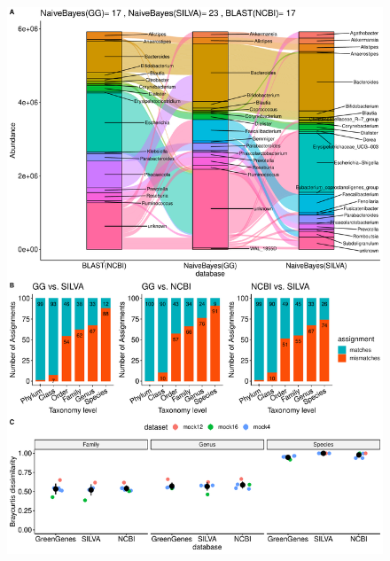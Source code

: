 \documentclass[letterpaper,12pt]{article}
\providecommand{\DIFaddend}{} %
\providecommand{\DIFdelbegin}{} %
\providecommand{\DIFdelend}{} %
\providecommand{\DIFaddbeginFL}{} %
\providecommand{\DIFaddendFL}{} %
\providecommand{\DIFdelbeginFL}{} %
\providecommand{\DIFdelendFL}{} %
\newcommand{\DIFscaledelfig}{0.5}
\newlength{\DIFdelgraphicswidth} %
\newlength{\DIFdelgraphicsheight} %
\newcommand{\DIFaddincludegraphics}[2][]{{\color{blue}\fbox{\DIFOincludegraphics[#1]{#2}}}} %
\newcommand{\DIFdelincludegraphics}[2][]{%
\sbox{\DIFdelgraphicsbox}{\DIFOincludegraphics[#1]{#2}}%
\settoboxwidth{\DIFdelgraphicswidth}{\DIFdelgraphicsbox} %
\settoboxtotalheight{\DIFdelgraphicsheight}{\DIFdelgraphicsbox} %
\scalebox{\DIFscaledelfig}{%
\parbox[b]{\DIFdelgraphicswidth}{\usebox{\DIFdelgraphicsbox}\\[-\baselineskip] \rule{\DIFdelgraphicswidth}{0em}}\llap{\resizebox{\DIFdelgraphicswidth}{\DIFdelgraphicsheight}{%
\setlength{\unitlength}{\DIFdelgraphicswidth}%
\begin{picture}(1,1)%
\thicklines\linethickness{2pt} %
{\color[rgb]{1,0,0}\put(0,0){\framebox(1,1){}}}%
{\color[rgb]{1,0,0}\put(0,0){\line( 1,1){1}}}%
{\color[rgb]{1,0,0}\put(0,1){\line(1,-1){1}}}%
\end{picture}%
}\hspace*{3pt}}} %
} %
\DeclareRobustCommand{\DIFaddend}{\DIFOaddend \let\includegraphics\DIFOincludegraphics} %
\DeclareRobustCommand{\DIFdelbegin}{\DIFOdelbegin \let\includegraphics\DIFdelincludegraphics} %
\DeclareRobustCommand{\DIFdelend}{\DIFOaddend \let\includegraphics\DIFOincludegraphics} %
\DeclareRobustCommand{\DIFaddbeginFL}{\DIFOaddbeginFL \let\includegraphics\DIFaddincludegraphics} %
\DeclareRobustCommand{\DIFaddendFL}{\DIFOaddendFL \let\includegraphics\DIFOincludegraphics} %
\DeclareRobustCommand{\DIFdelbeginFL}{\DIFOdelbeginFL \let\includegraphics\DIFdelincludegraphics} %
\DeclareRobustCommand{\DIFdelendFL}{\DIFOaddendFL \let\includegraphics\DIFOincludegraphics} %
\begin{document}
  \DIFaddend \FloatBarrier
  \newpage
  \DIFdelbegin %

\DIFdelend \begin{figure}[H]
    \centering
    \DIFdelbeginFL %
\DIFdelendFL \DIFaddbeginFL \includegraphics[width=\textwidth]{figure3.pdf}
  \DIFaddendFL \end{figure}
\end{document}
